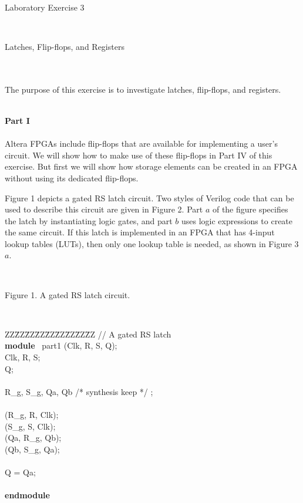 \documentclass[epsfig,10pt,fullpage]{article}
\begin{document}
~\\
~\\
~\\
\centerline{\huge Laboratory Exercise 3}
~\\
\centerline{\large Latches, Flip-flops, and Registers}
~\\
~\\
\noindent
The purpose of this exercise is to investigate latches, flip-flops, and registers.

~\\
\noindent
{\bf Part I}
~\\
~\\
\noindent
Altera FPGAs include flip-flops that are available for implementing a user's circuit. 
We will show how to make use of these flip-flops in Part IV of this exercise. But
first we will show how storage elements can be created in an FPGA without using 
its dedicated flip-flops.

Figure 1 depicts a gated RS latch circuit. Two styles of Verilog code
that can be used to describe this circuit are given in Figure 2. Part $a$ of the 
figure specifies the latch by instantiating logic gates, and part $b$ uses 
logic expressions to create the same circuit. If this latch is implemented
in an FPGA that has 4-input lookup tables (LUTs), then only one lookup table is needed, 
as shown in Figure 3$a$. 
~\\

\begin{figure}[H]
\scriptsize
\centerline{
\hbox{}}
\end{figure}
~\\
\centerline{Figure 1.  A gated RS latch circuit.}
~\\
\begin{center}
\begin{minipage}[t]{12.5 cm}
\begin{tabbing}
ZZ\=ZZ\=ZZ\=ZZ\=ZZ\=ZZ\=ZZ\=ZZ\=ZZ\kill
// A gated RS latch \\
{\bf module} ~part1 (Clk, R, S, Q);\\
 Clk, R, S;\\
 Q;\\
~\\
 R\_g, S\_g, Qa, Qb /* synthesis keep */ ;\\
~\\
 (R\_g, R, Clk);\\
 (S\_g, S, Clk);\\
 (Qa, R\_g, Qb);\\
 (Qb, S\_g, Qa);\\
~\\
 Q = Qa;\\
~\\
{\bf endmodule}\\
\end{tabbing}
\end{minipage}
\end{center}
\end{document}
